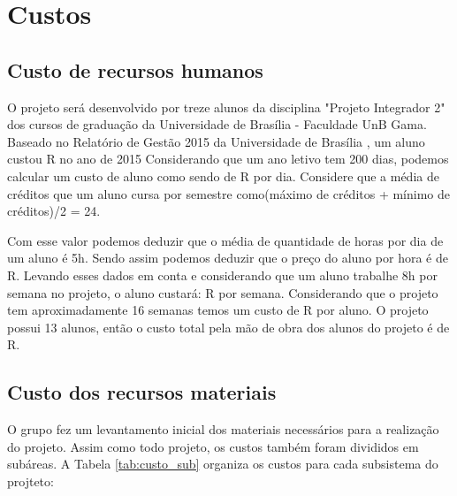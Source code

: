 \section{Custos}

\subsection{Custo de recursos humanos} \label{subsec:custos_rh}

O projeto será desenvolvido por treze alunos da disciplina "Projeto Integrador 2" dos cursos de graduação da Universidade de Brasília - Faculdade UnB Gama. Baseado no Relatório de Gestão 2015 da Universidade de Brasília \cite{unb2015}, um aluno custou R no ano de 2015 Considerando que um ano letivo tem 200 dias, podemos calcular um custo de aluno como sendo de R por dia. Considere que a média de créditos que um aluno cursa por semestre como(máximo de créditos + mínimo de créditos)/2 = 24. 

Com esse valor podemos deduzir que o média de quantidade de horas por dia de um aluno é 5h. Sendo assim podemos deduzir que o preço do aluno por hora é de R.
Levando esses dados em conta e considerando que um aluno trabalhe 8h por semana no projeto, o aluno custará: R por semana.
Considerando que o projeto tem aproximadamente 16 semanas temos um custo de R por aluno. O projeto possui 13 alunos, então o custo total pela mão de obra dos alunos do projeto é de R.



\subsection{Custo dos recursos materiais}
O grupo fez um levantamento inicial dos materiais necessários para a realização do projeto. Assim como todo projeto, os custos também foram divididos em subáreas. A Tabela \ref{tab:custo_sub} organiza os custos para cada subsistema do projteto:


